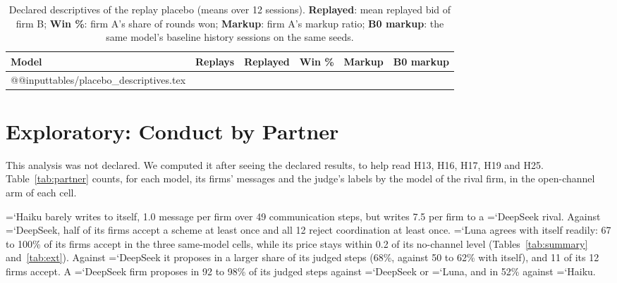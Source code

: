 \documentclass[11pt]{article}
\newcommand{\model}[1]{{\ttfamily\hyphenchar\font=`\-\relax #1}}
\newcommand{\DS}{\model{DeepSeek}}
\newcommand{\LU}{\model{Luna}}
\newcommand{\HK}{\model{Haiku}}
\begin{document}
\begin{table}[t]
\centering\small
\caption{Declared descriptives of the replay placebo (means over 12 sessions). \textbf{Replayed}: mean replayed bid of firm B; \textbf{Win \%}: firm A's share of rounds won; \textbf{Markup}: firm A's markup ratio; \textbf{\textcolor{cB}{B0} markup}: the same model's baseline history sessions on the same seeds.}
\label{tab:placebodesc}
\setlength{\tabcolsep}{2pt}
\begin{tabular}{llcccc}
\toprule
Model & Replays & Replayed & Win \% & Markup & \textcolor{cB}{B0} markup \\
\midrule
\csname @@input\endcsname tables/placebo_descriptives.tex
\bottomrule
\end{tabular}
\end{table}

\section{Exploratory: Conduct by Partner}
\label{app:partner}
This analysis was not declared. We computed it after seeing the declared results, to help read H13, H16, H17, H19 and H25. Table~\ref{tab:partner} counts, for each model, its firms' messages and the judge's labels by the model of the rival firm, in the open-channel arm of each cell.

\HK{} barely writes to itself, 1.0 message per firm over 49 communication steps, but writes 7.5 per firm to a \DS{} rival. Against \DS, half of its firms accept a scheme at least once and all 12 reject coordination at least once. \LU{} agrees with itself readily: 67 to 100\% of its firms accept in the three same-model cells, while its price stays within 0.2 of its no-channel level (Tables~\ref{tab:summary} and~\ref{tab:ext}). Against \DS{} it proposes in a larger share of its judged steps (68\%, against 50 to 62\% with itself), and 11 of its 12 firms accept. A \DS{} firm proposes in 92 to 98\% of its judged steps against \DS{} or \LU, and in 52\% against \HK{}.
\end{document}
